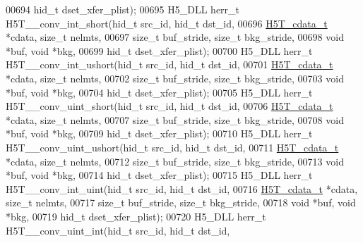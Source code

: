 \begin{DoxyCode}
00694                                    hid\_t dset\_xfer\_plist);
00695 H5\_DLL herr\_t H5T\_\_conv\_int\_short(hid\_t src\_id, hid\_t dst\_id,
00696                   \hyperlink{struct_h5_t__cdata__t}{H5T\_cdata\_t} *cdata, \textcolor{keywordtype}{size\_t} nelmts,
00697                   \textcolor{keywordtype}{size\_t} buf\_stride, \textcolor{keywordtype}{size\_t} bkg\_stride,
00698                                   \textcolor{keywordtype}{void} *buf, \textcolor{keywordtype}{void} *bkg,
00699                                   hid\_t dset\_xfer\_plist);
00700 H5\_DLL herr\_t H5T\_\_conv\_int\_ushort(hid\_t src\_id, hid\_t dst\_id,
00701                    \hyperlink{struct_h5_t__cdata__t}{H5T\_cdata\_t} *cdata, \textcolor{keywordtype}{size\_t} nelmts,
00702                    \textcolor{keywordtype}{size\_t} buf\_stride, \textcolor{keywordtype}{size\_t} bkg\_stride,
00703                                    \textcolor{keywordtype}{void} *buf, \textcolor{keywordtype}{void} *bkg,
00704                                    hid\_t dset\_xfer\_plist);
00705 H5\_DLL herr\_t H5T\_\_conv\_uint\_short(hid\_t src\_id, hid\_t dst\_id,
00706                    \hyperlink{struct_h5_t__cdata__t}{H5T\_cdata\_t} *cdata, \textcolor{keywordtype}{size\_t} nelmts,
00707                    \textcolor{keywordtype}{size\_t} buf\_stride, \textcolor{keywordtype}{size\_t} bkg\_stride,
00708                                    \textcolor{keywordtype}{void} *buf, \textcolor{keywordtype}{void} *bkg,
00709                                    hid\_t dset\_xfer\_plist);
00710 H5\_DLL herr\_t H5T\_\_conv\_uint\_ushort(hid\_t src\_id, hid\_t dst\_id,
00711                     \hyperlink{struct_h5_t__cdata__t}{H5T\_cdata\_t} *cdata, \textcolor{keywordtype}{size\_t} nelmts,
00712                     \textcolor{keywordtype}{size\_t} buf\_stride, \textcolor{keywordtype}{size\_t} bkg\_stride,
00713                                     \textcolor{keywordtype}{void} *buf, \textcolor{keywordtype}{void} *bkg,
00714                                     hid\_t dset\_xfer\_plist);
00715 H5\_DLL herr\_t H5T\_\_conv\_int\_uint(hid\_t src\_id, hid\_t dst\_id,
00716                  \hyperlink{struct_h5_t__cdata__t}{H5T\_cdata\_t} *cdata, \textcolor{keywordtype}{size\_t} nelmts,
00717                  \textcolor{keywordtype}{size\_t} buf\_stride, \textcolor{keywordtype}{size\_t} bkg\_stride,
00718                                  \textcolor{keywordtype}{void} *buf, \textcolor{keywordtype}{void} *bkg,
00719                                  hid\_t dset\_xfer\_plist);
00720 H5\_DLL herr\_t H5T\_\_conv\_uint\_int(hid\_t src\_id, hid\_t dst\_id,

\end{DoxyCode}
